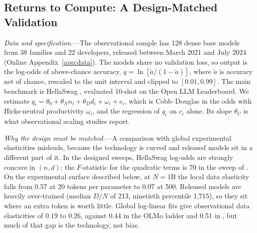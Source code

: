 \subsection{Returns to Compute: A Design-Matched Validation}\label{app:obs-matched}

\emph{Data and specification.}---The observational sample has 128 dense base models from 38 families and 22 developers,
released between March 2021 and July 2024 (Online Appendix~\ref{app:data}). The models share no validation loss, so
output is the log-odds of above-chance accuracy, $q=\ln[\tilde a/(1-\tilde a)]$, where $\tilde a$ is accuracy net of
chance, rescaled to the unit interval and clipped to $[0.01,0.99]$. The main benchmark is HellaSwag
\citep{zellers2019hellaswag}, evaluated 10-shot on the Open LLM Leaderboard. We estimate
$q_i=\theta_0+\theta_Nn_i+\theta_Dd_i+\omega_i+e_i$, which is Cobb--Douglas in the odds with Hicks-neutral productivity
$\omega_i$, and the regression of $q_i$ on $c_i$ alone. Its slope $\theta_C$ is what observational scaling studies
report.

\emph{Why the design must be matched.}---A comparison with global experimental elasticities misleads, because the
technology is curved and released models sit in a different part of it. In the designed sweeps, HellaSwag log-odds are
strongly concave in $(n,d)$; the $F$-statistic for the quadratic terms is 70 in the sweep of \citet{gadre2024language}.
On the experimental surface described below, at $N=1$B the local data elasticity falls from 0.57 at 20 tokens per
parameter to 0.07 at 500. Released models are heavily over-trained (median $D/N$ of 213, ninetieth percentile 1,715), so
they sit where an extra token is worth little. Global log-linear fits give observational data elasticities of 0.19 to
0.26, against 0.44 in the OLMo ladder and 0.51 in \citet{gadre2024language}, but much of that gap is the technology,
not bias.

